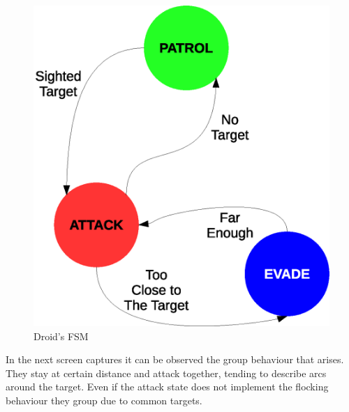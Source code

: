 \begin{figure}[!h]
  \centering
 \includegraphics[scale=0.35]{droidFSM.eps}
  \caption{Droid's FSM}
\end{figure}

In the next screen captures it can be observed the group behaviour that arises. They stay at certain distance and attack together, tending to describe arcs around the target. Even if the attack state does not implement the flocking behaviour they group due to common targets.


